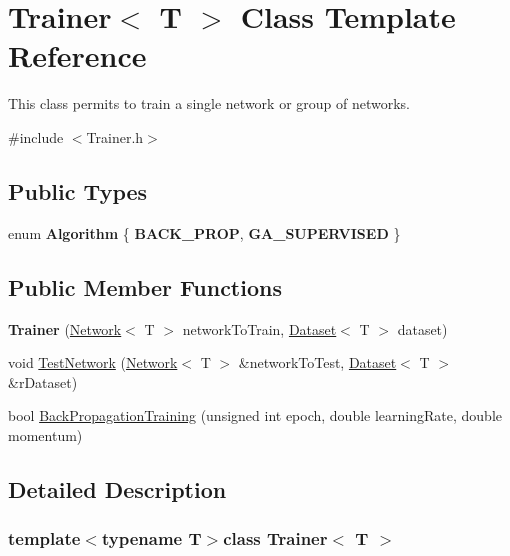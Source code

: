 \hypertarget{class_trainer}{\section{Trainer$<$ T $>$ Class Template Reference}
\label{class_trainer}
}


This class permits to train a single network or group of networks.  




{\ttfamily \#include $<$Trainer.\-h$>$}

\subsection*{Public Types}
\begin{DoxyCompactItemize}
\item 
enum {\bfseries Algorithm} \{ {\bfseries B\-A\-C\-K\-\_\-\-P\-R\-O\-P}, 
{\bfseries G\-A\-\_\-\-S\-U\-P\-E\-R\-V\-I\-S\-E\-D}
 \}
\end{DoxyCompactItemize}
\subsection*{Public Member Functions}
\begin{DoxyCompactItemize}
\item 
\hypertarget{class_trainer_a941152f64feaa19e6af48a78ce43c62f}{{\bfseries Trainer} (\hyperlink{class_network}{Network}$<$ T $>$ network\-To\-Train, \hyperlink{class_dataset}{Dataset}$<$ T $>$ dataset)}\label{class_trainer_a941152f64feaa19e6af48a78ce43c62f}

\item 
void \hyperlink{class_trainer_aa3c60fb2a4853a1adfe5b34c243ccbf6}{Test\-Network} (\hyperlink{class_network}{Network}$<$ T $>$ \&network\-To\-Test, \hyperlink{class_dataset}{Dataset}$<$ T $>$ \&r\-Dataset)
\item 
bool \hyperlink{class_trainer_ace9afdb3c754876928ca81d38e67fa8d}{Back\-Propagation\-Training} (unsigned int epoch, double learning\-Rate, double momentum)
\end{DoxyCompactItemize}


\subsection{Detailed Description}
\subsubsection*{template$<$typename T$>$class Trainer$<$ T $>$}

